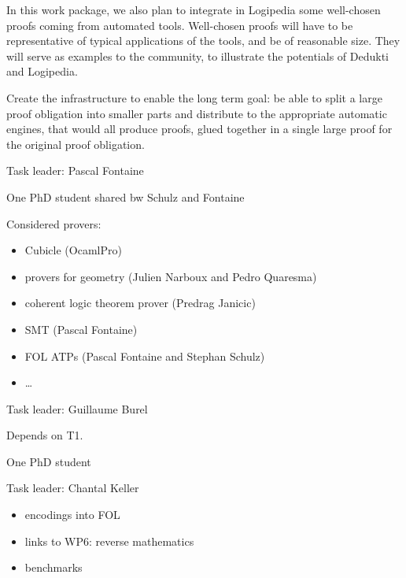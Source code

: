 \begin{workpackage}[id=atpetc,wphases=0-48,type=RTD,
  short=ATPs etc.,%
  title={ATP, SAT, SMT, Model checkers},
  lead=Lie,
  LieRM=10]
\begin{wpdescription}
In this work package, we also plan to integrate in Logipedia some
well-chosen proofs coming from automated tools.  Well-chosen proofs
will have to be representative of typical applications of the tools,
and be of reasonable size.  They will serve as examples to the
community, to illustrate the potentials of Dedukti and Logipedia.


Create the infrastructure to enable the long term goal: be able to split a large proof
obligation into smaller parts and distribute to the appropriate automatic engines, that
would all produce proofs, glued together in a single large proof for the original proof
obligation.
\end{wpdescription}


\begin{tasklist}
\begin{task}[id=instrumenting, title=Instrumenting ATPs to produce
  traces]
  Task leader: Pascal Fontaine

  One PhD student shared bw Schulz and Fontaine
  
Considered provers:
\begin{itemize}
\item Cubicle (OcamlPro)
\item provers for geometry (Julien Narboux and Pedro Quaresma)
\item coherent logic theorem prover (Predrag Janicic)
\item SMT (Pascal Fontaine)
\item FOL ATPs (Pascal Fontaine and Stephan Schulz)
\item \dots
\end{itemize}

\end{task}


\begin{task}[id=tracetodedukti, title=Translate ATP traces into Dedukti]
  Task leader: Guillaume Burel
  
  Depends on T1.

  One PhD student
  
\end{task}


\begin{task}[id=deduktitoatp, title=Translate Dedukti statements into ATPs inputs]
  Task leader: Chantal Keller

\begin{itemize}
\item encodings into FOL
\item links to WP6: reverse mathematics
\item benchmarks
\end{itemize}


\end{task}
\end{tasklist}
\end{workpackage}
